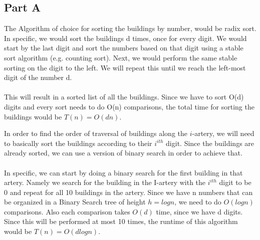 \documentclass[12pt,twoside]{article}
\begin{document}

\begin{problems}

\section*{Part A}

\problem  %

\begin{problemparts}
\problempart 

The Algorithm of choice for sorting the buildings by number, would be radix sort. In specific, we would sort the buildings d times, once for every digit. We would start by the last digit and sort the numbers based on that digit using a stable sort algorithm (e.g. counting sort). Next, we would perform the same stable sorting on the digit to the left. We will repeat this until we reach the left-most digit of the number d.
\\
\\
This will result in a sorted list of all the buildings. Since we have to sort O(d) digits and every sort needs to do O(n) comparisons, the total time for sorting the buildings would be $T(n)=O(dn)$.

\problempart 
In order to find the order of traversal of buildings along the $i$-artery, we will need to basically sort the buildings according to their $i^{ith}$ digit. Since the buildings are already sorted, we can use a version of binary search in order to achieve that.
\\\\
In specific, we can start by doing a binary search for the first building in that artery. Namely we search for the building in the I-artery with the $i^{ith}$ digit to be 0 and repeat for all 10 buildings in the artery. 
Since we have n numbers that can be organized in a Binary Search tree of height $h=logn$, we need to do $O(logn)$ comparisons. Also each comparison takes $O(d)$ time, since we have d digits. Since this will be performed at most 10 times, the runtime of this algorithm would be $T(n)=O(d logn)$.
 

\end{problemparts}


\end{problems}
\end{document}

